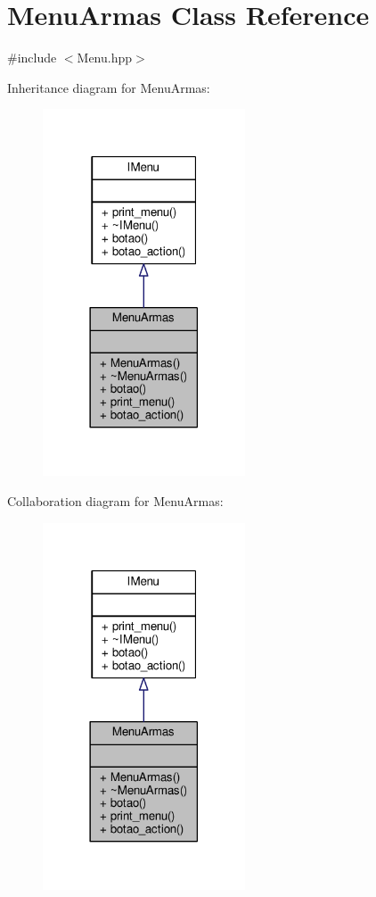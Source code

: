 \hypertarget{class_menu_armas}{}\section{Menu\+Armas Class Reference}
\label{class_menu_armas}


{\ttfamily \#include $<$Menu.\+hpp$>$}



Inheritance diagram for Menu\+Armas\+:\nopagebreak
\begin{figure}[H]
\begin{center}
\leavevmode
\includegraphics[width=170pt]{class_menu_armas__inherit__graph}
\end{center}
\end{figure}


Collaboration diagram for Menu\+Armas\+:\nopagebreak
\begin{figure}[H]
\begin{center}
\leavevmode
\includegraphics[width=170pt]{class_menu_armas__coll__graph}
\end{center}
\end{figure}
